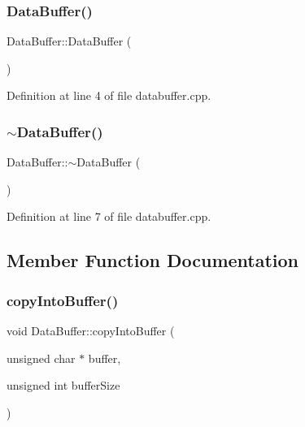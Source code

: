 \subsubsection{\texorpdfstring{DataBuffer()}{DataBuffer()}}
{\footnotesize\ttfamily Data\+Buffer\+::\+Data\+Buffer (\begin{DoxyParamCaption}{ }\end{DoxyParamCaption})}



Definition at line 4 of file databuffer.\+cpp.

\mbox{\label{class_data_buffer_ac374f86810cc019a248be28d1babecdb}} 
\subsubsection{\texorpdfstring{$\sim$DataBuffer()}{~DataBuffer()}}
{\footnotesize\ttfamily Data\+Buffer\+::$\sim$\+Data\+Buffer (\begin{DoxyParamCaption}{ }\end{DoxyParamCaption})}



Definition at line 7 of file databuffer.\+cpp.



\subsection{Member Function Documentation}
\mbox{\label{class_data_buffer_ace8e72da6186e807b6826e1b63597a01}} 
\subsubsection{\texorpdfstring{copyIntoBuffer()}{copyIntoBuffer()}}
{\footnotesize\ttfamily void Data\+Buffer\+::copy\+Into\+Buffer (\begin{DoxyParamCaption}\item[{unsigned char $\ast$}]{buffer,  }\item[{unsigned int}]{buffer\+Size }\end{DoxyParamCaption})}



